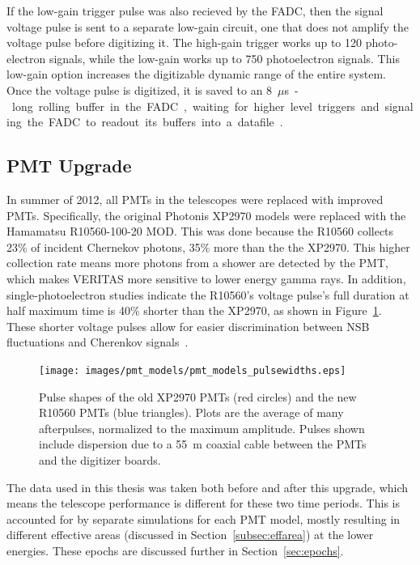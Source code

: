 If the low-gain trigger pulse was also recieved by the FADC, then the signal voltage pulse is sent to a separate low-gain circuit, one that does not amplify the voltage pulse before digitizing it.
The high-gain trigger works up to 120 photo-electron signals, while the low-gain works up to 750 photoelectron signals.
This low-gain option increases the digitizable dynamic range of the entire system.
Once the voltage pulse is digitized, it is saved to an \SI{8}{$\mu$s}-long rolling buffer in the FADC, waiting for higher level triggers and signaling the FADC to readout its buffers into a datafile~\cite{Veritas_Detector,veritas_FADC}.

\subsection{PMT Upgrade}
In summer of 2012, all PMTs in the telescopes were replaced with improved PMTs.
Specifically, the original Photonis XP2970 models were replaced with the Hamamatsu R10560-100-20 MOD.
This was done because the R10560 collects 23\% of incident Chernekov photons, 35\% more than the the XP2970.
This higher collection rate means more photons from a shower are detected by the PMT, which makes VERITAS more sensitive to lower energy gamma rays.
In addition, single-photoelectron studies indicate the R10560's voltage pulse's full duration at half maximum time is \nicetilde{}40\% shorter than the XP2970, as shown in Figure~\ref{fig:pmt_pulse_widths}.
These shorter voltage pulses allow for easier discrimination between NSB fluctuations and Cherenkov signals~\cite{pmtmodels}.

\begin{figure}[ht]
  \centering
  \texttt{[image: images/pmt\_models/pmt\_models\_pulsewidths.eps]}
  \caption[Pulse Shapes]{
    Pulse shapes of the old XP2970 PMTs (red circles) and the new R10560 PMTs (blue triangles).
    Plots are the average of many afterpulses, normalized to the maximum amplitude.
    Pulses shown include dispersion due to a \nicetilde{}\SI{55}{m} coaxial cable between the PMTs and the digitizer boards.~\cite{pmtmodels}}
  \label{fig:pmt_pulse_widths}
\end{figure}

The data used in this thesis was taken both before and after this upgrade, which means the telescope performance is different for these two time periods.
This is accounted for by separate simulations for each PMT model, mostly resulting in different effective areas (discussed in Section~\ref{subsec:effarea}) at the lower energies.
These epochs are discussed further in Section~\ref{sec:epochs}.



